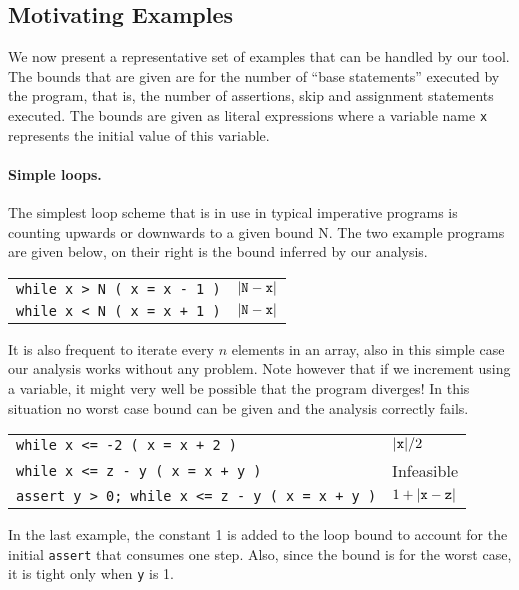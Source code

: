 \documentclass[nocopyrightspace,preprint]{sigplanconf}
\begin{document}
\subsection{Motivating Examples}

We now present a representative set of examples that can be
handled by our tool.  The bounds that are given are for the number
of ``base statements'' executed by the program, that is, the number
of assertions, skip and assignment statements executed.  The
bounds are given as literal expressions where a variable name {\tt x}
represents the initial value of this variable.

\paragraph{Simple loops.} The simplest loop scheme that is in
use in typical imperative programs is counting upwards or
downwards to a given bound N.  The two example programs
are given below, on their right is the bound inferred by our analysis.
\begin{center}
\begin{tabular}{p{} | p{} }
\lstinline|while x > N ( x = x - 1 )| & $|{\tt N} -  {\tt x}|$ \\
\lstinline|while x < N ( x = x + 1 )| & $|{\tt N} -  {\tt x}|$ \\
\end{tabular}
\end{center}

It is also frequent to iterate every $n$ elements in an array, also
in this simple case our analysis works without any problem.  Note
however that if we increment using a variable, it might very well be
possible that the program diverges!  In this situation no worst
case bound can be given and the analysis correctly fails.
\begin{center}
\begin{tabular}{p{} | p{} }
\lstinline|while x <= -2 ( x = x + 2 )| & $| {\tt x} | / 2$ \\
\lstinline|while x <= z - y ( x = x + y )| & Infeasible \\
\lstinline|assert y > 0; while x <= z - y ( x = x + y )| & $1 + |{\tt x} - {\tt z}|$
\end{tabular}
\end{center}
In the last example, the constant 1 is added to the loop bound
to account for the initial \texttt{assert} that consumes one
step.  Also, since the bound is for the worst case, it is tight
only when {\tt y} is 1.
\end{document}
